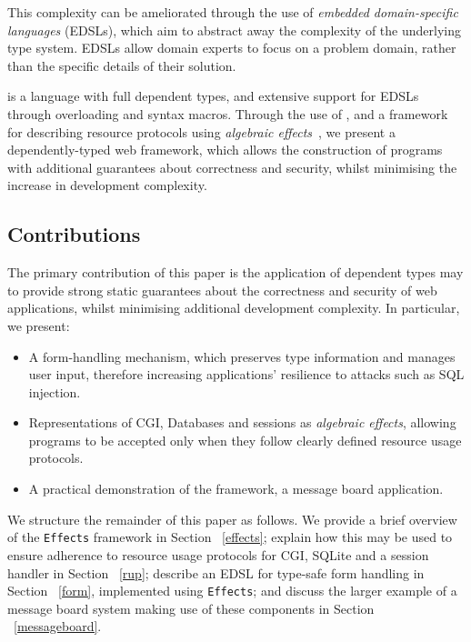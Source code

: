 \documentclass[preprint]{sigplanconf}
\begin{document}
This complexity can be ameliorated through the use of \textit{embedded
domain-specific languages} (EDSLs), which aim to abstract away the
complexity of the underlying type system. EDSLs allow domain experts to
focus on a problem domain, rather than the specific details of their
solution.

\idris{} \cite{brady2011idris} is a language with full dependent types, and
extensive support for EDSLs through overloading and syntax macros. Through the
use of \idris{}, and a framework for describing resource protocols using
\emph{algebraic effects}~\cite{brady:effects}, we
present a dependently-typed web framework, which allows the construction of
programs with additional guarantees about correctness and security, whilst
minimising the increase in development complexity. 

\subsection{Contributions}
The primary contribution of this paper is the application of 
dependent types may to provide strong static guarantees
about the correctness and security of web applications, whilst minimising
additional development complexity. In particular, we present:

\begin{itemize}
\item A form-handling mechanism, which preserves type information and
manages user input, therefore
increasing applications' resilience to attacks such as SQL injection.

\item Representations of CGI, Databases and sessions as
\textit{algebraic effects}, allowing programs to be accepted only when they
follow clearly defined resource usage protocols.

\item A practical demonstration of the framework, a message board application.

\end{itemize}

We structure the remainder of this paper as follows. We provide a brief
overview of the \texttt{Effects} framework in Section ~\ref{effects}; explain
how this may be used to ensure adherence to resource usage protocols for CGI,
SQLite and a session handler in Section ~\ref{rup}; describe an EDSL for
type-safe form handling in Section ~\ref{form}, implemented using
\texttt{Effects}; and discuss the larger example
of a message board system making use of these components in Section
~\ref{messageboard}.
\end{document}
